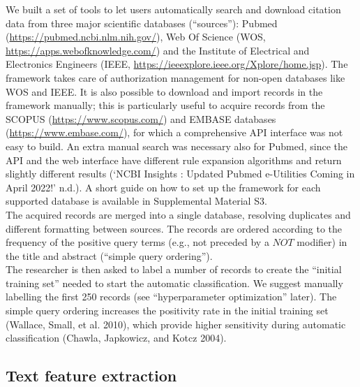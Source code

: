 \documentclass{article}
\begin{document}
We built a set of tools to let users automatically search and download
citation data from three major scientific databases (``sources''):
Pubmed (\url{https://pubmed.ncbi.nlm.nih.gov/}), Web Of Science (WOS,
\url{https://apps.webofknowledge.com/}) and the Institute of Electrical
and Electronics Engineers (IEEE,
\url{https://ieeexplore.ieee.org/Xplore/home.jsp}). The framework takes
care of authorization management for non-open databases like WOS and
IEEE. It is also possible to download and import records in the
framework manually; this is particularly useful to acquire records from
the SCOPUS (\url{https://www.scopus.com/}) and EMBASE databases
(\url{https://www.embase.com/}), for which a comprehensive API interface
was not easy to build. An extra manual search was necessary also for
Pubmed, since the API and the web interface have different rule
expansion algorithms and return slightly different results ({`NCBI
Insights : Updated Pubmed e-Utilities Coming in April 2022!'} n.d.). A
short guide on how to set up the framework for each supported database
is available in Supplemental Material S3.\\
The acquired records are merged into a single database, resolving
duplicates and different formatting between sources. The records are
ordered according to the frequency of the positive query terms (e.g.,
not preceded by a \(NOT\) modifier) in the title and abstract (``simple
query ordering'').\\
The researcher is then asked to label a number of records to create the
``initial training set'' needed to start the automatic classification.
We suggest manually labelling the first 250 records (see
``hyperparameter optimization'' later). The simple query ordering
increases the positivity rate in the initial training set (Wallace,
Small, et al. 2010), which provide higher sensitivity during automatic
classification (Chawla, Japkowicz, and Kotcz 2004).

\hypertarget{text-feature-extraction}{%
\subsection{Text feature extraction}\label{text-feature-extraction}}
\end{document}
